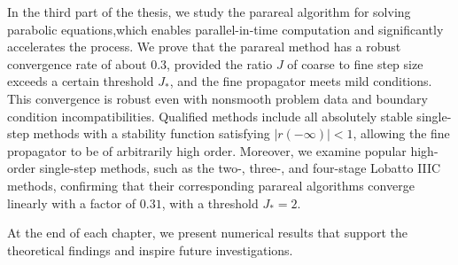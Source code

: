 In the third part of the thesis, we study the parareal algorithm for solving parabolic equations,which enables parallel-in-time computation and significantly accelerates the process. We prove that the parareal method has a robust convergence rate of about 0.3, provided the ratio $J$ of coarse to fine step size exceeds a certain threshold $J_*$, and the fine propagator meets mild conditions. This convergence is robust even with nonsmooth problem data and boundary condition incompatibilities. Qualified methods include all absolutely stable single-step methods with a stability function satisfying $|r(-\infty)| < 1$, allowing the fine propagator to be of arbitrarily high order. Moreover, we examine popular high-order single-step methods, such as the two-, three-, and four-stage Lobatto IIIC methods, confirming that their corresponding parareal algorithms converge linearly with a factor of $0.31$, with a threshold $J_* = 2$. 

At the end of each chapter, we present numerical results that support the theoretical findings and inspire future investigations.